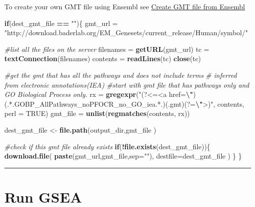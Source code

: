\documentclass[
]{book}
\newenvironment{Shaded}{\begin{snugshade}}{\end{snugshade}}
\newcommand{\AttributeTok}[1]{\textcolor[rgb]{0.13,0.29,0.53}{#1}}
\newcommand{\CommentTok}[1]{\textcolor[rgb]{0.56,0.35,0.01}{\textit{#1}}}
\newcommand{\ConstantTok}[1]{\textcolor[rgb]{0.56,0.35,0.01}{#1}}
\newcommand{\ControlFlowTok}[1]{\textcolor[rgb]{0.13,0.29,0.53}{\textbf{#1}}}
\newcommand{\FunctionTok}[1]{\textcolor[rgb]{0.13,0.29,0.53}{\textbf{#1}}}
\newcommand{\NormalTok}[1]{#1}
\newcommand{\OtherTok}[1]{\textcolor[rgb]{0.56,0.35,0.01}{#1}}
\newcommand{\SpecialCharTok}[1]{\textcolor[rgb]{0.81,0.36,0.00}{\textbf{#1}}}
\newcommand{\StringTok}[1]{\textcolor[rgb]{0.31,0.60,0.02}{#1}}
\begin{document}
To create your own GMT file using Ensembl see \hyperref[create-gmt-file-from-ensembl]{Create GMT file from Ensembl}

\begin{Shaded}
\begin{Highlighting}[]
\ControlFlowTok{if}\NormalTok{(dest\_gmt\_file }\SpecialCharTok{==} \StringTok{""}\NormalTok{)\{}
\NormalTok{  gmt\_url }\OtherTok{=} \StringTok{"http://download.baderlab.org/EM\_Genesets/current\_release/Human/symbol/"}
  
  \CommentTok{\#list all the files on the server}
\NormalTok{  filenames }\OtherTok{=} \FunctionTok{getURL}\NormalTok{(gmt\_url)}
\NormalTok{  tc }\OtherTok{=} \FunctionTok{textConnection}\NormalTok{(filenames)}
\NormalTok{  contents }\OtherTok{=} \FunctionTok{readLines}\NormalTok{(tc)}
  \FunctionTok{close}\NormalTok{(tc)}
  
  \CommentTok{\#get the gmt that has all the pathways and does not include terms }
  \CommentTok{\# inferred from electronic annotations(IEA)}
  \CommentTok{\#start with gmt file that has pathways only and GO Biological Process only.}
\NormalTok{  rx }\OtherTok{=} \FunctionTok{gregexpr}\NormalTok{(}\StringTok{"(?\textless{}=\textless{}a href=}\SpecialCharTok{\textbackslash{}"}\StringTok{)(.*.GOBP\_AllPathways\_noPFOCR\_no\_GO\_iea.*.)(.gmt)(?=}\SpecialCharTok{\textbackslash{}"}\StringTok{\textgreater{})"}\NormalTok{,}
\NormalTok{    contents, }\AttributeTok{perl =} \ConstantTok{TRUE}\NormalTok{)}
\NormalTok{  gmt\_file }\OtherTok{=} \FunctionTok{unlist}\NormalTok{(}\FunctionTok{regmatches}\NormalTok{(contents, rx))}
  
\NormalTok{  dest\_gmt\_file }\OtherTok{\textless{}{-}} \FunctionTok{file.path}\NormalTok{(output\_dir,gmt\_file )}
  
  \CommentTok{\#check if this gmt file already exists}
  \ControlFlowTok{if}\NormalTok{(}\SpecialCharTok{!}\FunctionTok{file.exists}\NormalTok{(dest\_gmt\_file))\{}
    \FunctionTok{download.file}\NormalTok{(}
      \FunctionTok{paste}\NormalTok{(gmt\_url,gmt\_file,}\AttributeTok{sep=}\StringTok{""}\NormalTok{),}
      \AttributeTok{destfile=}\NormalTok{dest\_gmt\_file}
\NormalTok{    )}
\NormalTok{  \}}
\NormalTok{\}}
\end{Highlighting}
\end{Shaded}

\begin{center}\rule{0.5\linewidth}{0.5pt}\end{center}

\section{Run GSEA}\label{run-gsea}
\end{document}
